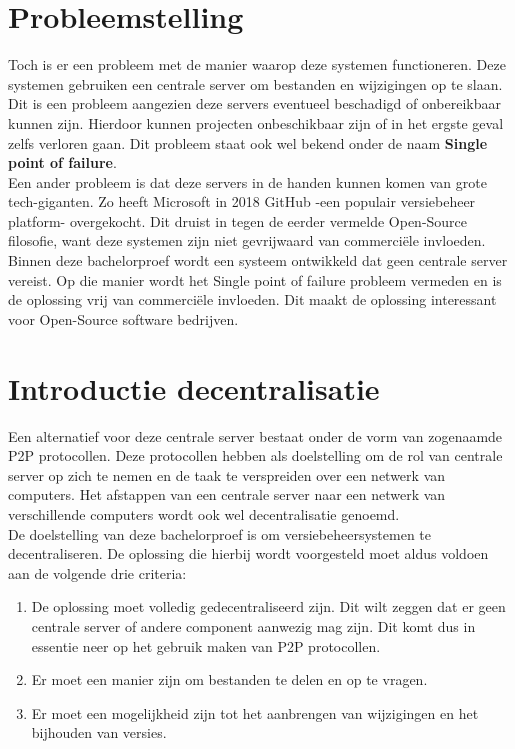 \section{Probleemstelling}
Toch is er een probleem met de manier waarop deze systemen functioneren. Deze systemen gebruiken een centrale server om bestanden en wijzigingen op te slaan. Dit is een probleem aangezien deze servers eventueel beschadigd of onbereikbaar kunnen zijn. Hierdoor kunnen projecten onbeschikbaar zijn of in het ergste geval zelfs verloren gaan. Dit probleem staat ook wel bekend onder de naam \textbf{Single point of failure}.\\

Een ander probleem is dat deze servers in de handen kunnen komen van grote tech-giganten. Zo heeft Microsoft in 2018 GitHub -een populair versiebeheer platform- overgekocht. Dit druist in tegen de eerder vermelde Open-Source filosofie, want deze systemen zijn niet gevrijwaard van commerciële invloeden.\\

Binnen deze bachelorproef wordt een systeem ontwikkeld dat geen centrale server vereist. Op die manier wordt het Single point of failure probleem vermeden en is de oplossing vrij van commerciële invloeden. Dit maakt de oplossing interessant voor Open-Source software bedrijven.
\section{Introductie decentralisatie}
Een alternatief voor deze centrale server bestaat onder de vorm van zogenaamde P2P protocollen. Deze protocollen hebben als doelstelling om de rol van centrale server op zich te nemen en de taak te verspreiden over een netwerk van computers. Het afstappen van een centrale server naar een netwerk van verschillende computers wordt ook wel decentralisatie genoemd.\\

De doelstelling van deze bachelorproef is om versiebeheersystemen te  decentraliseren. De oplossing die hierbij wordt voorgesteld moet aldus voldoen aan de volgende drie criteria:

\begin{enumerate}
 \item De oplossing moet volledig gedecentraliseerd zijn. Dit wilt zeggen dat er geen centrale server of andere component aanwezig mag zijn. Dit komt dus in essentie neer op het gebruik maken van P2P protocollen.\\
 \item Er moet een manier zijn om bestanden te delen en op te vragen.\\
 \item Er moet een mogelijkheid zijn tot het aanbrengen van wijzigingen en het bijhouden van versies.
\end{enumerate}

